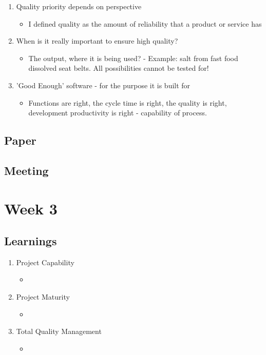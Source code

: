 \begin{enumerate}
\item Quality priority depends on perspective
\begin{itemize}
\item I defined quality as the amount of reliability that a product or service has
\end{itemize}
\item When is it really important to ensure high quality?
\begin{itemize}
\item The output, where it is being used? - Example: salt from fast food dissolved seat belts. All possibilities cannot be tested for!
\end{itemize}
\item 'Good Enough' software - for the purpose it is built for
\begin{itemize}
\item Functions are right, the cycle time is right, the quality is right, development productivity is right - capability of process.
\end{itemize}
\end{enumerate}

\section{Paper}

\section{Meeting}
\chapter{Week 3}

\section{Learnings}
\begin{enumerate}
\item Project Capability
\begin{itemize}
\item
\end{itemize}
\item Project Maturity
\begin{itemize}
\item
\end{itemize}
\item Total Quality Management
\begin{itemize}
\item
\end{itemize}
\end{enumerate}

